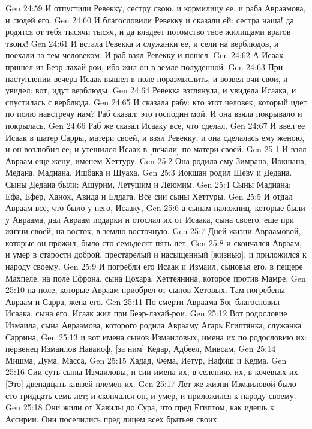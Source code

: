 Gen 24:59  И отпустили Ревекку, сестру свою, и кормилицу ее, и раба Авраамова, и людей его.
Gen 24:60  И благословили Ревекку и сказали ей: сестра наша! да родятся от тебя тысячи тысяч, и да владеет потомство твое жилищами врагов твоих!
Gen 24:61  И встала Ревекка и служанки ее, и сели на верблюдов, и поехали за тем человеком. И раб взял Ревекку и пошел.
Gen 24:62  А Исаак пришел из Беэр-лахай-рои, ибо жил он в земле полуденной.
Gen 24:63  При наступлении вечера Исаак вышел в поле поразмыслить, и возвел очи свои, и увидел: вот, идут верблюды.
Gen 24:64  Ревекка взглянула, и увидела Исаака, и спустилась с верблюда.
Gen 24:65  И сказала рабу: кто этот человек, который идет по полю навстречу нам? Раб сказал: это господин мой. И она взяла покрывало и покрылась.
Gen 24:66  Раб же сказал Исааку все, что сделал.
Gen 24:67  И ввел ее Исаак в шатер Сарры, матери своей, и взял Ревекку, и она сделалась ему женою, и он возлюбил ее; и утешился Исаак в [печали] по матери своей.
Gen 25:1  И взял Авраам еще жену, именем Хеттуру.
Gen 25:2  Она родила ему Зимрана, Иокшана, Медана, Мадиана, Ишбака и Шуаха.
Gen 25:3  Иокшан родил Шеву и Дедана. Сыны Дедана были: Ашурим, Летушим и Леюмим.
Gen 25:4  Сыны Мадиана: Ефа, Ефер, Ханох, Авида и Елдага. Все сии сыны Хеттуры.
Gen 25:5  И отдал Авраам все, что было у него, Исааку,
Gen 25:6  а сынам наложниц, которые были у Авраама, дал Авраам подарки и отослал их от Исаака, сына своего, еще при жизни своей, на восток, в землю восточную.
Gen 25:7  Дней жизни Авраамовой, которые он прожил, было сто семьдесят пять лет;
Gen 25:8  и скончался Авраам, и умер в старости доброй, престарелый и насыщенный [жизнью], и приложился к народу своему.
Gen 25:9  И погребли его Исаак и Измаил, сыновья его, в пещере Махпеле, на поле Ефрона, сына Цохара, Хеттеянина, которое против Мамре,
Gen 25:10  на поле, которые Авраам приобрел от сынов Хетовых. Там погребены Авраам и Сарра, жена его.
Gen 25:11  По смерти Авраама Бог благословил Исаака, сына его. Исаак жил при Беэр-лахай-рои.
Gen 25:12  Вот родословие Измаила, сына Авраамова, которого родила Аврааму Агарь Египтянка, служанка Саррина;
Gen 25:13  и вот имена сынов Измаиловых, имена их по родословию их: первенец Измаилов Наваиоф, [за ним] Кедар, Адбеел, Мивсам,
Gen 25:14  Мишма, Дума, Масса,
Gen 25:15  Хадад, Фема, Иетур, Нафиш и Кедма.
Gen 25:16  Сии суть сыны Измаиловы, и сии имена их, в селениях их, в кочевьях их. [Это] двенадцать князей племен их.
Gen 25:17  Лет же жизни Измаиловой было сто тридцать семь лет; и скончался он, и умер, и приложился к народу своему.
Gen 25:18  Они жили от Хавилы до Сура, что пред Египтом, как идешь к Ассирии. Они поселились пред лицем всех братьев своих.
